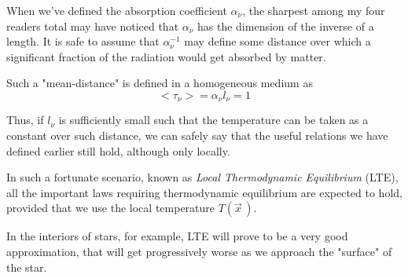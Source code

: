 \par When we've defined the absorption coefficient $\alpha_{\nu}$, the sharpest among my four readers total may have noticed that $\alpha_{\nu}$ has the dimension of the inverse of a length. It is safe to assume that $\alpha_{\nu}^{-1}$ may define some distance over which a significant fraction of the radiation would get absorbed by matter.
\par Such a "mean-distance" is defined in a homogeneous medium as 
\begin{equation*}
	<\tau_{\nu}> = \alpha_{\nu}l_{\nu} = 1
\end{equation*}
\par Thus, if $l_{\nu}$ is sufficiently small such that the temperature can be taken as a constant over such distance, we can safely say that the useful relations we have defined earlier still hold, although only locally.
\par In such a fortunate scenario, known as \emph{Local Thermodynamic Equilibrium} (LTE), all the important laws requiring thermodynamic equilibrium are expected to hold, provided that we use the local temperature $T(\vec{x}\,)$.
\par In the interiors of stars, for example, LTE will prove to be a very good approximation, that will get progressively worse as we approach the "surface" of the star.
